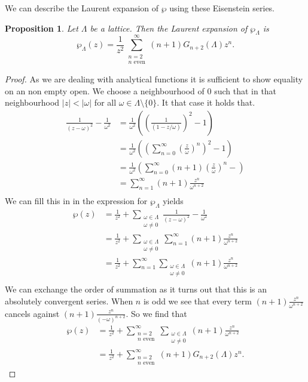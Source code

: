 \documentclass[a4paper]{article}
\theoremstyle{theoremdd}
\newtheorem{proposition}[theorem]{Proposition}
\theoremstyle{definitiondd}
\theoremstyle{remarkdd}
\begin{document}
We can describe the Laurent expansion of $\wp$ using these Eisenstein series.
\begin{proposition}\label{prop:laurent_weierstrass}
  Let $\Lambda$ be a lattice. Then the Laurent expansion of $\wp_\Lambda$ is \[
	  \wp_\Lambda(z) = \frac{1}{z^2} \sum_{\substack{n = 2 \\ n \text{ even}}}^{\infty}(n+ 1) G_{n + 2}(\Lambda)z^{n}
  .\] 
\end{proposition}
\begin{proof}
	As we are dealing with analytical functions it is sufficient to show equality on an non empty open. We choose a neighbourhood of 0 such that in that neighbourhood $|z| < |\omega|$ for all $\omega \in \Lambda \setminus \{ 0\} $. It that case it holds that. 
\begin{align*}
	\frac{1}{(z- \omega)^2} - \frac{1}{\omega^2} &= \frac{1}{\omega^2}\left( \left( \frac{1}{(1-z / \omega)} \right) ^2 - 1 \right)  \\
						     &= \frac{1}{\omega^2}\left( \left( \sum_{n = 0}^{\infty} \left(\frac{z}{\omega}\right)^{n} \right)^2 - 1  \right) \\
						     &= \frac{1}{\omega^2}\left( \sum_{n = 0}^{\infty} (n + 1)  \left( \frac{z}{\omega} \right) ^{n} - \right)  \\
						     &= \sum_{n = 1}^{\infty} (n + 1)  \frac{z^{n}}{\omega^{n+2}} \\
\end{align*}	
We can fill this in in the expression for $\wp_\Lambda$ yields
\begin{align*}
	\wp(z) &= 
	\frac{1}{z^2} + \sum_{\substack{\omega \in \Lambda \\ \omega \ne 0 }} \frac{1}{(z - \omega)^2} - \frac{1}{\omega^2} \\
	       &=  \frac{1}{z^2} + \sum_{\substack{\omega \in \Lambda \\ \omega \ne 0}} \sum _{n = 1}^{\infty} (n + 1)  \frac{z^{n}}{\omega^{n+2}}\\
	       &= \frac{1}{z^2} + \sum_{n = 1}^{\infty}\sum_{\substack{\omega \in \Lambda \\ \omega \ne 0 }} (n + 1) \frac{z^{n}}{\omega^{n+2}} \\
\end{align*}
We can exchange the order of summation as it turns out that this is an absolutely convergent series. 
When $n$ is odd we see that every term $ (n + 1) \frac{z^{n}}{\omega^{n+2}}$ cancels against $(n + 1) \frac{z^{n}}{(-\omega)^{n+2}}$. 
So we find that 
\begin{align*}
	\wp(z) &= \frac{1}{z^2} + \sum_{\substack{n = 2\\ n \text{ even}}}^{\infty}\sum_{\substack{\omega \in \Lambda \\ \omega \ne 0 }} (n + 1) \frac{z^{n}}{\omega^{n+2}} \\
	       &=\frac{1}{z^2} + \sum_{\substack{n = 2 \\ n \text{ even}}}^{\infty} (n+1) G_{n + 2}(\Lambda) z^{n}
.\end{align*}
\end{proof}
\end{document}

